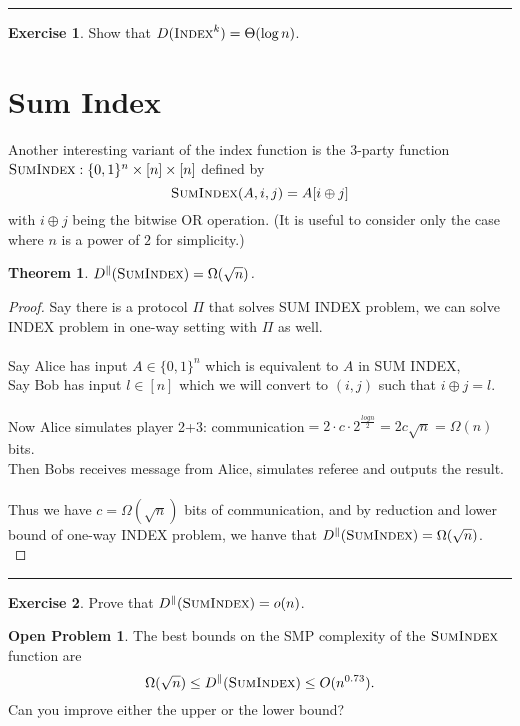 \documentclass[11pt,oneside]{book}
\theoremstyle{plain}
\newtheorem{theorem}{Theorem}
\theoremstyle{definition}
\newtheorem{exercise}{Exercise}
\newtheorem{open}{Open Problem}
\theoremstyle{plain}
\newcommand{\Index}{\textsc{Index}}
\newcommand{\SumIndex}{\textsc{SumIndex}}
\newcommand{\exercises}{\bigskip \noindent\rule{8cm}{0.4pt} \medskip}
\begin{document}
	\exercises
	
	\begin{exercise}
		Show that $D(\Index^k) = \Theta(\log n)$.
	\end{exercise}
	
	
	 
	\section{Sum Index}
	
	Another interesting variant of the index function is the 3-party function $\SumIndex : \{0,1\}^n \times [n] \times [n]$ defined by
	\[
	\SumIndex(A,i,j) = A[ i \oplus j]
	\]
	with $i \oplus j$ being the bitwise OR operation. (It is useful to consider only the case where $n$ is a power of $2$ for simplicity.)
	
	\begin{theorem}
		$D^\parallel(\SumIndex) = \Omega(\sqrt{n})$.
	\end{theorem}
	
	\begin{proof}
	Say there is a protocol $\Pi$ that solves SUM INDEX problem, we can solve INDEX problem in one-way setting with $\Pi$ as well.\\
	 \\
	Say Alice has input $A \in \{0,1\}^n$ which is equivalent to $A$ in SUM INDEX,\\
	Say Bob has input $l \in [n]$ which we will convert to $(i,j)$ such that $i\oplus j=l$.\\
	 \\
	Now Alice simulates player 2+3: communication$=2\cdot c\cdot 2^{\frac{logn}{2}}=2c\sqrt{n}=\Omega(n)$ bits.\\
	Then Bobs receives message from Alice, simulates referee and outputs the result. \\
	 \\
	Thus we have $c=\Omega(\sqrt{n})$ bits of communication, and by reduction and lower bound of one-way INDEX problem, we hanve that $D^\parallel(\SumIndex) = \Omega(\sqrt{n})$.\\
	\end{proof}
	
	\exercises
	
	\begin{exercise}
		Prove that $D^\parallel(\SumIndex) = o(n)$.
	\end{exercise}
	
	\begin{open}
		The best bounds on the SMP complexity of the $\SumIndex$ function are
		\[
		\Omega(\sqrt{n}) \le D^\parallel(\SumIndex) \le O(n^{0.73}).
		\]
		Can you improve either the upper or the lower bound?
	\end{open}
\end{document}

